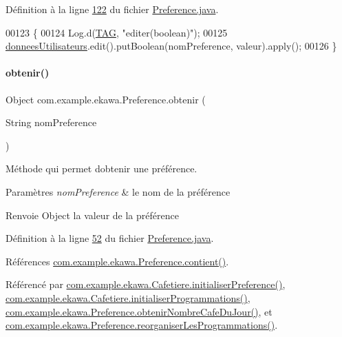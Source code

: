 Définition à la ligne \hyperlink{_preference_8java_source_l00122}{122} du fichier \hyperlink{_preference_8java_source}{Preference.\+java}.


\begin{DoxyCode}
00123     \{
00124         Log.d(\hyperlink{classcom_1_1example_1_1ekawa_1_1_preference_aeb5e1e787153c37929839622ac5d0339}{TAG}, \textcolor{stringliteral}{"editer(boolean)"});
00125         \hyperlink{classcom_1_1example_1_1ekawa_1_1_preference_a5ac49439bd1c8c3ff12dd9eb2475b894}{donneesUtilisateurs}.edit().putBoolean(nomPreference, valeur).apply();
00126     \}
\end{DoxyCode}
\mbox{\label{classcom_1_1example_1_1ekawa_1_1_preference_a485d7fe31708aa1b85c0e2dcdcc05c0d}} 
\paragraph{\texorpdfstring{obtenir()}{obtenir()}}
{\footnotesize\ttfamily Object com.\+example.\+ekawa.\+Preference.\+obtenir (\begin{DoxyParamCaption}\item[{String}]{nom\+Preference }\end{DoxyParamCaption})}



Méthode qui permet d\textquotesingle{}obtenir une préférence. 


\begin{DoxyParams}{Paramètres}
{\em nom\+Preference} & le nom de la préférence \\
\hline
\end{DoxyParams}
\begin{DoxyReturn}{Renvoie}
Object la valeur de la préférence 
\end{DoxyReturn}


Définition à la ligne \hyperlink{_preference_8java_source_l00052}{52} du fichier \hyperlink{_preference_8java_source}{Preference.\+java}.



Références \hyperlink{_preference_8java_source_l00087}{com.\+example.\+ekawa.\+Preference.\+contient()}.



Référencé par \hyperlink{_cafetiere_8java_source_l00122}{com.\+example.\+ekawa.\+Cafetiere.\+initialiser\+Preference()}, \hyperlink{_cafetiere_8java_source_l00692}{com.\+example.\+ekawa.\+Cafetiere.\+initialiser\+Programmations()}, \hyperlink{_preference_8java_source_l00063}{com.\+example.\+ekawa.\+Preference.\+obtenir\+Nombre\+Cafe\+Du\+Jour()}, et \hyperlink{_preference_8java_source_l00157}{com.\+example.\+ekawa.\+Preference.\+reorganiser\+Les\+Programmations()}.


